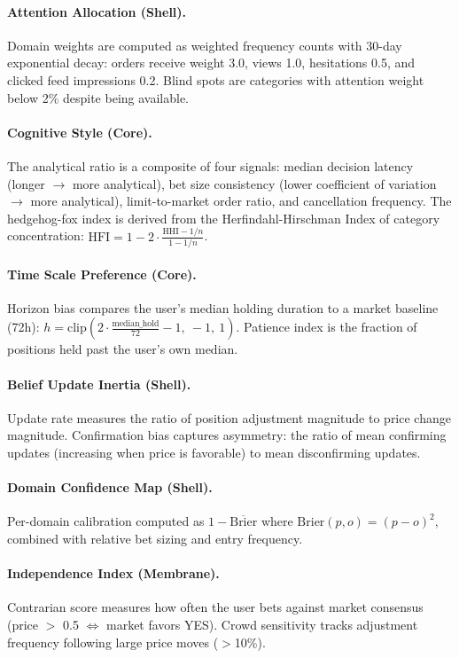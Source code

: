 \documentclass[11pt]{article}
\begin{document}
\paragraph{Attention Allocation (Shell).}
Domain weights are computed as weighted frequency counts with 30-day exponential decay: orders receive weight 3.0, views 1.0, hesitations 0.5, and clicked feed impressions 0.2. Blind spots are categories with attention weight below 2\% despite being available.

\paragraph{Cognitive Style (Core).}
The analytical ratio is a composite of four signals: median decision latency (longer $\to$ more analytical), bet size consistency (lower coefficient of variation $\to$ more analytical), limit-to-market order ratio, and cancellation frequency. The hedgehog-fox index is derived from the Herfindahl-Hirschman Index of category concentration: $\text{HFI} = 1 - 2 \cdot \frac{\text{HHI} - 1/n}{1 - 1/n}$.

\paragraph{Time Scale Preference (Core).}
Horizon bias compares the user's median holding duration to a market baseline (72h): $h = \text{clip}(2 \cdot \frac{\text{median\_hold}}{72} - 1,\ -1,\ 1)$. Patience index is the fraction of positions held past the user's own median.

\paragraph{Belief Update Inertia (Shell).}
Update rate measures the ratio of position adjustment magnitude to price change magnitude. Confirmation bias captures asymmetry: the ratio of mean confirming updates (increasing when price is favorable) to mean disconfirming updates.

\paragraph{Domain Confidence Map (Shell).}
Per-domain calibration computed as $1 - \overline{\text{Brier}}$ where $\text{Brier}(p, o) = (p - o)^2$, combined with relative bet sizing and entry frequency.

\paragraph{Independence Index (Membrane).}
Contrarian score measures how often the user bets against market consensus (price $>$ 0.5 $\Leftrightarrow$ market favors YES). Crowd sensitivity tracks adjustment frequency following large price moves ($>$10\%).
\end{document}
